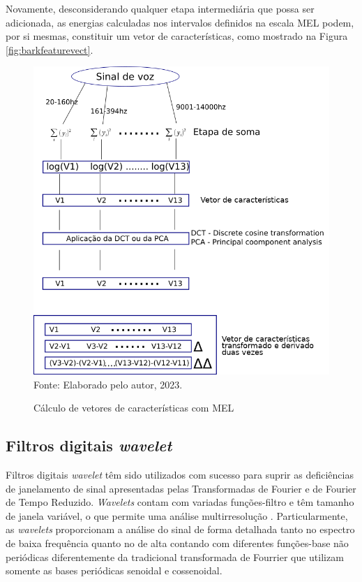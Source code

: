 \documentclass[a4paper,12pt,openright,oneside]{book}
\newenvironment{myenv}[1]
  {\begin{spacing}{#1}}
  {\end{spacing}}
\begin{document}
\begin{myenv}{1.5}
						\par Novamente, desconsiderando qualquer etapa intermediária que possa ser adicionada, as energias calculadas nos intervalos definidos na escala MEL podem, por si mesmas, constituir um vetor de características, como mostrado na Figura \ref{fig:barkfeaturevect}.
						
						\begin{figure}[h]
							\centering
							\caption{Cálculo de vetores de características com MEL}
							\includegraphics[width=0.8\linewidth]{images/melFeatureVect}
							\label{fig:melfeaturevect}
							\\Fonte: Elaborado pelo autor, 2023.
						\end{figure}
				
					\subsection{Filtros digitais \textit{wavelet}}
						\par Filtros digitais \textit{wavelet} têm sido utilizados com sucesso para suprir as deficiências de janelamento de sinal apresentadas pelas Transformadas de Fourier e de Fourier de Tempo Reduzido. \textit{Wavelets} contam com variadas funções-filtro e têm tamanho de janela variável, o que permite uma análise multirresolução \cite{Rod5254905}. Particularmente, as \textit{wavelets} proporcionam a análise do sinal de forma detalhada tanto no espectro de baixa frequência quanto no de alta contando com diferentes funções-base não periódicas diferentemente da tradicional transformada de Fourrier que utilizam somente as bases periódicas senoidal e cossenoidal.
						

\end{myenv}
\end{document}
